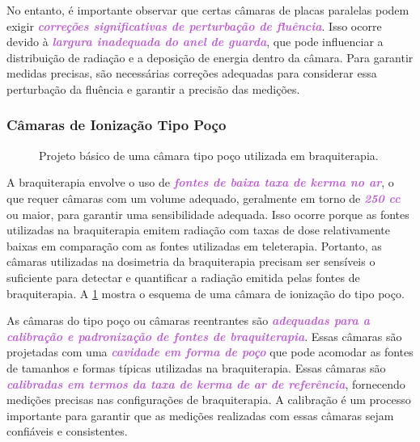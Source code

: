 \documentclass[11pt,a4paper]{article}
\begin{document}
	No entanto, é importante observar que certas câmaras de placas paralelas podem exigir \textcolor{MediumOrchid}{\textit{\textbf{correções significativas de perturbação de fluência}}}. Isso ocorre devido à \textcolor{MediumOrchid}{\textit{\textbf{largura inadequada do anel de guarda}}}, que pode influenciar a distribuição de radiação e a deposição de energia dentro da câmara. Para garantir medidas precisas, são necessárias correções adequadas para considerar essa perturbação da fluência e garantir a precisão das medições.

\subsubsection*{Câmaras de Ionização Tipo Poço}

	\begin{figure}
		\centering
		\caption{Projeto básico de uma câmara tipo poço utilizada em braquiterapia.}
		\label{fig:camaraPoco2}
	\end{figure}

	A braquiterapia envolve o uso de \textcolor{MediumOrchid}{\textit{\textbf{fontes de baixa taxa de kerma no ar}}}, o que requer câmaras com um volume adequado, geralmente em torno de \textcolor{MediumOrchid}{\textit{\textbf{250 cc}}} ou maior, para garantir uma sensibilidade adequada. Isso ocorre porque as fontes utilizadas na braquiterapia emitem radiação com taxas de dose relativamente baixas em comparação com as fontes utilizadas em teleterapia. Portanto, as câmaras utilizadas na dosimetria da braquiterapia precisam ser sensíveis o suficiente para detectar e quantificar a radiação emitida pelas fontes de braquiterapia. A \ref{fig:camaraPoco2} mostra o esquema de uma câmara de ionização do tipo poço.

	As câmaras do tipo poço ou câmaras reentrantes são \textcolor{MediumOrchid}{\textit{\textbf{adequadas para a calibração e padronização de fontes de braquiterapia}}}. Essas câmaras são projetadas com uma \textcolor{MediumOrchid}{\textit{\textbf{cavidade em forma de poço}}} que pode acomodar as fontes de tamanhos e formas típicas utilizadas na braquiterapia. Essas câmaras são \textcolor{MediumOrchid}{\textit{\textbf{calibradas em termos da taxa de kerma de ar de referência}}}, fornecendo medições precisas nas configurações de braquiterapia. A calibração é um processo importante para garantir que as medições realizadas com essas câmaras sejam confiáveis e consistentes.
\end{document}
